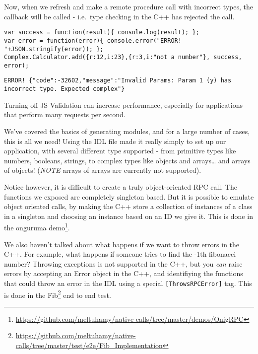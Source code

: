 \documentclass[]{article}
\begin{document}
Now, when we refresh and make a remote procedure call with incorrect
types, the callback will be called - i.e.~type checking in the C++ has
rejected the call.

\begin{verbatim}
var success = function(result){ console.log(result); };
var error = function(error){ console.error("ERROR! "+JSON.stringify(error)); };
Complex.Calculator.add({r:12,i:23},{r:3,i:"not a number"}, success, error);
\end{verbatim}

\begin{verbatim}
ERROR! {"code":-32602,"message":"Invalid Params: Param 1 (y) has incorrect type. Expected complex"}
\end{verbatim}

Turning off JS Validation can increase performance, especially for
applications that perform many requests per second.


We've covered the basics of generating modules, and for a large number
of cases, this is all we need! Using the IDL file made it really simply
to set up our application, with several different type supported - from
primitive types like numbers, booleans, strings, to complex types like
objects and arrays\ldots{} and arrays of objects! (\emph{NOTE} arrays of
arrays are currently not supported).

Notice however, it is difficult to create a truly object-oriented RPC
call. The functions we exposed are completely singleton based. But it is
possible to emulate object oriented calls, by making the C++ store a
collection of instances of a class in a singleton and choosing an
instance based on an ID we give it. This is done in the onguruma 
demo\footnote{\url{https://github.com/meltuhamy/native-calls/tree/master/demos/OnigRPC}}.

We also haven't talked about what happens if we want to throw errors in
the C++. For example, what happens if someone tries to find the -1th
fibonacci number? Throwing exceptions is not supported in the C++, but
you \emph{can} raise errors by accepting an Error object in the C++, and
identifiying the functions that could throw an error in the IDL using a
special \texttt{{[}ThrowsRPCError{]}} tag. This is done in the
Fib\footnote{\url{https://github.com/meltuhamy/native-calls/tree/master/test/e2e/Fib_Implementation}}
end to end test.
\end{document}
